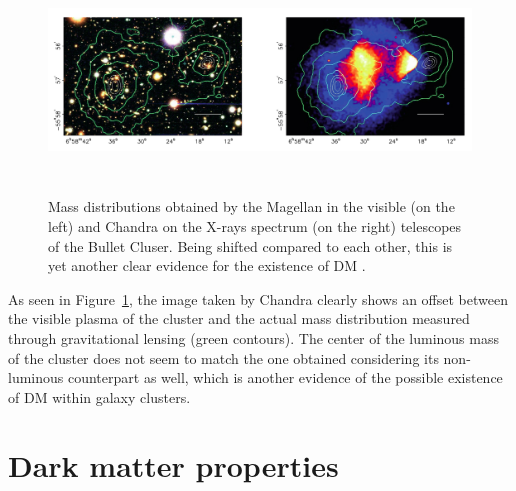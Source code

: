 \documentclass[a4paper, 10pt, openright]{report}
\begin{document}
\begin{figure}[htbp]
\begin{center}
\includegraphics[width=14cm, height=6cm]{figs/BulletCluster.png}
\caption{Mass distributions obtained by the Magellan in the visible (on the left) and Chandra on the X-rays spectrum (on the right) telescopes of the Bullet Cluser. Being shifted compared to each other, this is yet another clear evidence for the existence of \ac{DM} \cite{BulletClusterSigma}.}
\label{figure:BulletCluster}
\end{center}
\end{figure}

As seen in Figure~\ref{figure:BulletCluster}, the image taken by Chandra clearly shows an offset between the visible plasma of the cluster and the actual mass distribution measured through gravitational lensing (green contours). The center of the luminous mass of the cluster does not seem to match the one obtained considering its non-luminous counterpart as well, which is another evidence of the possible existence of \ac{DM} within galaxy clusters.

\section{Dark matter properties} \label{section:DMProperties}
\end{document}
